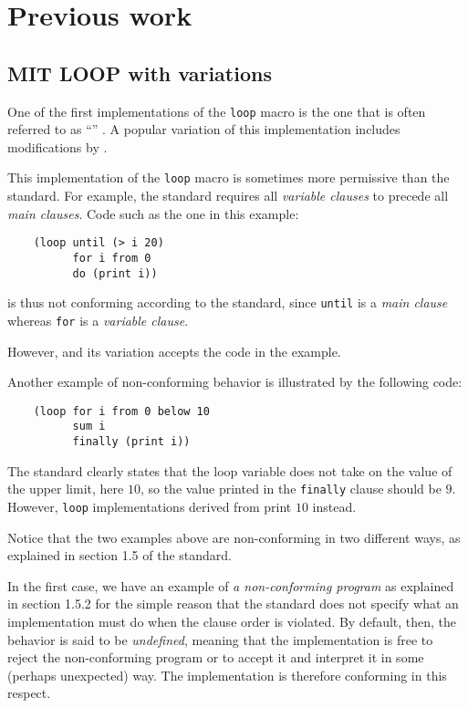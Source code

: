 \section{Previous work}

\subsection{MIT LOOP with variations}
\label{sec-mit-loop}

One of the first implementations of the \commonlisp{} \texttt{loop}
macro is the one that is often referred to as ``\mitloop{}''
\cite{Burke:Moon:MIT.loop}.  A popular variation of this
implementation includes modifications by \symbolics{}.

This implementation of the \texttt{loop} macro is sometimes more
permissive than the \commonlisp{} standard.  For example, the standard
requires all \emph{variable clauses} to precede all \emph{main
  clauses}.  Code such as the one in this example:

\begin{verbatim}
    (loop until (> i 20)
          for i from 0
          do (print i))
\end{verbatim}

\noindent
is thus not conforming according to the standard, since \texttt{until}
is a \emph{main clause} whereas \texttt{for} is a \emph{variable
  clause}.

However, \mitloop{} and its variation accepts the code in the example.

Another example of non-conforming behavior is illustrated by the
following code:

\begin{verbatim}
    (loop for i from 0 below 10
          sum i
          finally (print i))
\end{verbatim}

The \commonlisp{} standard clearly states that the loop variable does
not take on the value of the upper limit, here $10$, so the value
printed in the \texttt{finally} clause should be $9$.  However,
\texttt{loop} implementations derived from \mitloop{} print $10$
instead.

Notice that the two examples above are non-conforming in two different
ways, as explained in section 1.5 of the \commonlisp{} standard.

In the first case, we have an example of \emph{a non-conforming
  program} as explained in section 1.5.2 for the simple reason that
the standard does not specify what an implementation must do when the
clause order is violated.  By default, then, the behavior is said to
be \emph{undefined}, meaning that the implementation is free to reject
the non-conforming program or to accept it and interpret it in some
(perhaps unexpected) way.  The \mitloop{} implementation is therefore
conforming in this respect.

